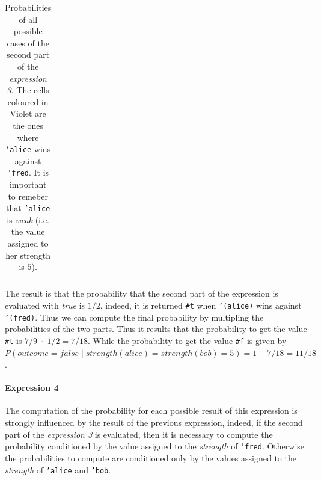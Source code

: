 \begin{itemize}
\begin{table}[H]
\begin{tabular}{| l | C{1.8cm} C{1.8cm} C{1.8cm} C{1.8cm}  |}
                    \hline
                \end{tabular}
            \egroup
            \caption{
                Probabilities of all possible cases of the second part of the \textit{expression 3}. 
                The cells coloured in Violet are the ones where \texttt{'alice} wins against \texttt{'fred}.
                It is important to remeber that \texttt{'alice} is \textit{weak} (i.e. the value assigned to her strength is $5$).
            }
            \label{tab:exp-3}
        \end{table}

        The result is that the probability that the second part of the expression is evaluated with \textit{true} is $1/2$, indeed,
        it is returned \texttt{\#t} when \texttt{'(alice)} wins against \texttt{'(fred)}. Thus we can compute the final probability
        by multipling the probabilities of the two parts. Thus it results that the probability to get the value \texttt{\#t} is
        $7/9\;\cdot\;1/2 = 7/18$. While the probability to get the value \texttt{\#f} is given by 
        $P(outcome = false\;|\;strength(alice) = strength(bob) = 5) = 1 - 7/18 = 11/18$.
        
        \paragraph*{Expression 4} The computation of the probability for each possible result of this expression is strongly 
        influenced by the result of the previous expression, indeed, if the second part of the \textit{expression 3} is evaluated,
        then it is necessary to compute the probability conditioned by the value assigned to the \textit{strength} of \texttt{'fred}.
        Otherwise the probabilities to compute are conditioned only by the values assigned to the \textit{strength} of \texttt{'alice}
        and \texttt{'bob}.


\end{itemize}
